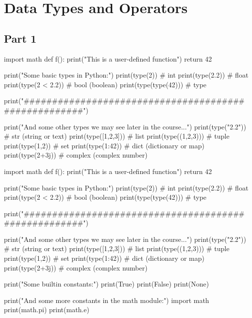\chapter{Data Types and Operators}

\section{Part 1}

\begin{runpython}
import math
def f():
    print("This is a user-defined function")
    return 42

print("Some basic types in Python:")
print(type(2))           # int
print(type(2.2))         # float
print(type(2 < 2.2))     # bool (boolean)
print(type(type(42)))    # type

print("#####################################################")

print("And some other types we may see later in the course...")
print(type("2.2"))       # str (string or text)
print(type([1,2,3]))     # list
print(type((1,2,3)))     # tuple
print(type({1,2}))       # set
print(type({1:42}))      # dict (dictionary or map)
print(type(2+3j))        # complex  (complex number)
\end{runpython}


\begin{runpython}
import math
def f():
    print("This is a user-defined function")
    return 42

print("Some basic types in Python:")
print(type(2))           # int
print(type(2.2))         # float
print(type(2 < 2.2))     # bool (boolean)
print(type(type(42)))    # type

print("#####################################################")

print("And some other types we may see later in the course...")
print(type("2.2"))       # str (string or text)
print(type([1,2,3]))     # list
print(type((1,2,3)))     # tuple
print(type({1,2}))       # set
print(type({1:42}))      # dict (dictionary or map)
print(type(2+3j))        # complex  (complex number)
\end{runpython}

\begin{runpython}  
print("Some builtin constants:")
print(True)
print(False)
print(None)

print("And some more constants in the math module:")
import math
print(math.pi)
print(math.e)
\end{runpython}

